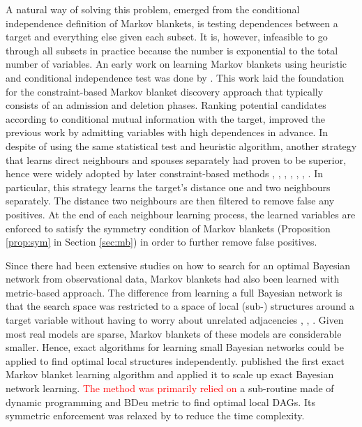 A natural way of solving this problem, emerged from the conditional independence definition of Markov blankets, is testing dependences between a target and everything else given each subset. It is, however, infeasible to go through all subsets in practice because the number is exponential to the total number of variables. An early work on learning Markov blankets using heuristic and conditional independence test was done by \cite{margaritis1999bayesian}. This work laid the foundation for the constraint-based Markov blanket discovery approach that typically consists of an admission and deletion phases. Ranking potential candidates according to conditional mutual information with the target, \cite{tsamardinos2003algorithms} improved the previous work by admitting variables with high dependences in advance. In despite of using the same statistical test and heuristic algorithm, another strategy that learns direct neighbours and spouses separately had proven to be superior, hence were widely adopted by later constraint-based methods \cite{aliferis2003hiton}, \cite{tsamardinos2003time}, \cite{pena2007towards}, \cite{fu2008fast}, \cite{aliferis2010locala}, \cite{demorais2010novel}, \cite{liu2016swamping}. In particular, this strategy learns the target's distance one and two neighbours separately. The distance two neighbours are then filtered to remove false any positives. At the end of each neighbour learning process, the learned variables are enforced to satisfy the symmetry condition of Markov blankets (Proposition \ref{prop:sym} in Section \ref{sec:mb}) in order to further remove false positives. 

Since there had been extensive studies on how to search for an optimal Bayesian network from observational data, Markov blankets had also been learned with metric-based approach. The difference from learning a full Bayesian network is that the search space was restricted to a space of local (sub-) structures around a target variable without having to worry about unrelated adjacencies \cite{cooper1997evaluation}, \cite{madden2002new}, \cite{acid2013score}. Given most real models are sparse, Markov blankets of these models are considerable smaller. Hence, exact algorithms for learning small Bayesian networks could be applied to find optimal local structures independently. \cite{niinimaki2012local} published the first exact Markov blanket learning algorithm and applied it to scale up exact Bayesian network learning. \textcolor{red}{The method was primarily relied on} a sub-routine made of dynamic programming and BDeu metric to find optimal local DAGs. Its symmetric enforcement was relaxed by \cite{gao2017efficient} to reduce the time complexity. 

